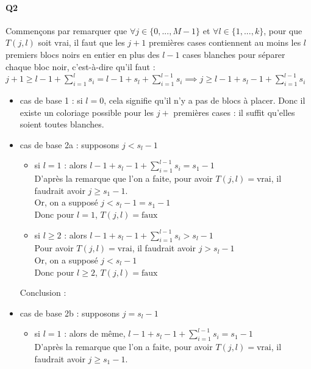 \documentclass[12pt]{article}
\newcommand{\true}{\text{vrai}}
\newcommand{\false}{\text{faux}}
\begin{document}
			\paragraph{Q2}
				Commençons par remarquer que $ \forall j \in \{0,...,M-1\} $ et $ \forall l \in \{1,...,k\} $, pour que $ T(j,l) $ soit vrai, il faut que les $ j+1 $ premières cases contiennent au moins les $ l $ premiers blocs noirs en entier en plus des $ l-1 $ cases blanches pour séparer chaque bloc noir, c'est-à-dire qu'il faut : \\
				$ j+1 \geq l-1 + \sum\limits_{i=1}^{l} s_i = l-1 + s_l + \sum\limits_{i=1}^{l-1} s_i \implies \boxed{j \geq l-1 + s_l-1 + \sum\limits_{i=1}^{l-1} s_i} $
				\begin{itemize}
					\item cas de base 1 : si $ l = 0 $, cela signifie qu'il n'y a pas de blocs à placer. Donc il existe un coloriage possible pour les $ j+ $ premières cases : il suffit qu'elles soient toutes blanches.
					\item cas de base 2a : supposons $ j < s_l-1 $
					\begin{itemize}
						\item si $ l=1 $ : alors $ l-1 + s_l-1 + \sum\limits_{i=1}^{l-1} s_i = s_1 - 1 $ \\
						D'après la remarque que l'on a faite, pour avoir $ T(j,l) = \true $, il faudrait avoir $ j \geq s_1-1 $. \\
						Or, on a supposé $ j < s_l-1 = s_1 - 1 $ \\
						Donc pour $ l=1 $, $ T(j,l) = \false $
						\item si $ l \geq 2 $ : alors $ l-1 + s_l-1 + \sum\limits_{i=1}^{l-1} s_i > s_l - 1 $\\
						Pour avoir $ T(j,l) = \true $, il faudrait avoir $ j > s_l - 1 $ \\
						Or, on a supposé $ j < s_l-1 $ \\
						Donc pour $ l \geq 2 $, $ T(j,l) = \false $
					\end{itemize}
					Conclusion : \fbox{$ \forall l \geq 1 $, si $ j < s_l - 1 $, alors  $ T(j,l) = \false $}
					\item cas de base 2b : supposons $ j = s_l - 1 $
					\begin{itemize}
						\item si $ l=1 $ : alors de même, $ l-1 + s_l-1 + \sum\limits_{i=1}^{l-1} s_i = s_1 - 1 $ \\
						D'après la remarque que l'on a faite, pour avoir $ T(j,l) = \true $, il faudrait avoir $ j \geq s_1-1 $. \\

\end{itemize}
\end{itemize}
\end{document}
